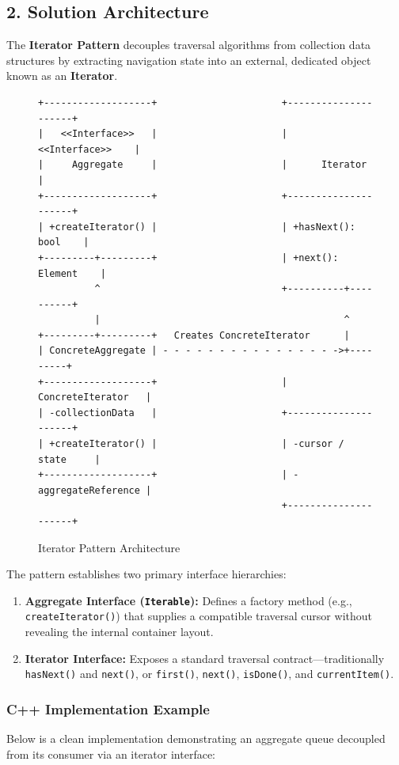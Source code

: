 \subsection{2. Solution Architecture}
The \textbf{Iterator Pattern} decouples traversal algorithms from collection data structures by extracting navigation state into an external, dedicated object known as an \textbf{Iterator}. 

\begin{figure}[htbp]
\centering
\begin{verbatim}
+-------------------+                      +---------------------+
|   <<Interface>>   |                      |    <<Interface>>    |
|     Aggregate     |                      |      Iterator       |
+-------------------+                      +---------------------+
| +createIterator() |                      | +hasNext(): bool    |
+---------+---------+                      | +next(): Element    |
          ^                                +----------+----------+
          |                                           ^
+---------+---------+   Creates ConcreteIterator      |
| ConcreteAggregate | - - - - - - - - - - - - - - - ->+---------+
+-------------------+                      |  ConcreteIterator   |
| -collectionData   |                      +---------------------+
| +createIterator() |                      | -cursor / state     |
+-------------------+                      | -aggregateReference |
                                           +---------------------+
\end{verbatim}
\caption{Iterator Pattern Architecture}
\end{figure}

The pattern establishes two primary interface hierarchies:
\begin{enumerate}
    \item \textbf{Aggregate Interface (\texttt{Iterable}):} Defines a factory method (e.g., \texttt{createIterator()}) that supplies a compatible traversal cursor without revealing the internal container layout.
    \item \textbf{Iterator Interface:} Exposes a standard traversal contract—traditionally \texttt{hasNext()} and \texttt{next()}, or \texttt{first()}, \texttt{next()}, \texttt{isDone()}, and \texttt{currentItem()}.
\end{enumerate}

\subsubsection{C++ Implementation Example}
Below is a clean implementation demonstrating an aggregate queue decoupled from its consumer via an iterator interface:

